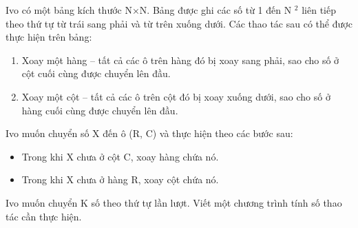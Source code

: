 Ivo có một bảng kích thước N×N. Bảng được ghi các số từ 1 đến N $^ 2 $ liên tiếp theo thứ tự từ trái sang phải và từ trên xuống dưới. Các thao tác sau có thể được thực hiện trên bảng:
\begin{enumerate}
	\item Xoay một hàng – tất cả các ô trên hàng đó bị xoay sang phải, sao cho số ở cột cuối cùng được chuyển lên đầu.
	\item Xoay một cột – tất cả các ô trên cột đó bị xoay xuống dưới, sao cho số ở hàng cuối cùng được chuyển lên đầu.
\end{enumerate}

Ivo muốn chuyển số X đến ô (R, C) và thực hiện theo các bước sau:
\begin{itemize}
	\item Trong khi X chưa ở cột C, xoay hàng chứa nó.
	\item Trong khi X chưa ở hàng R, xoay cột chứa nó.
\end{itemize}

Ivo muốn chuyển K số theo thứ tự lần lượt. Viết một chương trình tính số thao tác cần thực hiện.

\